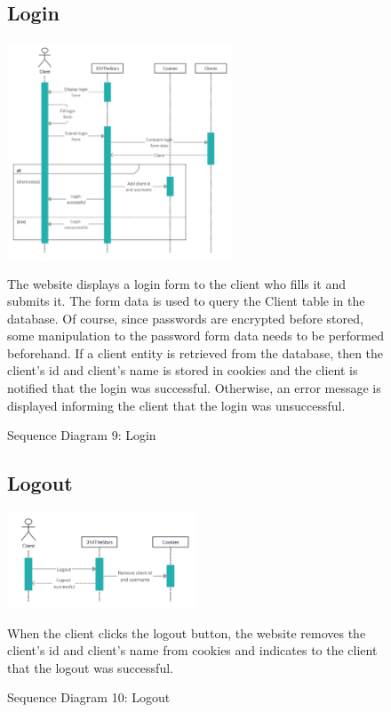 \documentclass[11pt]{article}
\newcounter{use case ID}
\begin{document}
\begin{figure}[ht!]
    \subsection{Login}
    \centering
    \includegraphics[width=0.6\textwidth,height=0.3\paperheight]{Diagrams/Sequence/Login.jpg}
    \caption{Sequence Diagram 9: Login}
    \label{fig: Login}
    \begin{justify}
        The website displays a login form to the client who fills it and submits it. The form data is used to query the Client table in the database. Of course, since passwords are encrypted before stored, some manipulation to the password form data needs to be performed beforehand. If a client entity is retrieved from the database, then the client’s id and client's name is stored in cookies and the client is notified that the login was successful. Otherwise, an error message is displayed informing the client that the login was unsuccessful.
    \end{justify}
\end{figure}

\begin{figure}[ht!]
    \subsection{Logout}
    \centering
    \includegraphics[width=0.5\textwidth,height=0.15\paperheight]{Diagrams/Sequence/Logout.jpg}
    \caption{Sequence Diagram 10: Logout}
    \label{fig: Logout}
    \begin{justify}
        When the client clicks the logout button, the website removes the client’s id and client's name from cookies and indicates to the client that the logout was successful.
    \end{justify}
\end{figure}
\end{document}
